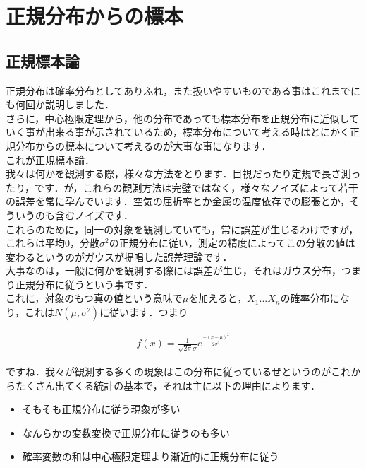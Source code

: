 \documentclass[11pt,a4paper,uplatex]{ujreport} 	%
\begin{document}
\section{正規分布からの標本}

\subsection{正規標本論}
正規分布は確率分布としてありふれ，また扱いやすいものである事はこれまでにも何回か説明しました．\\

さらに，中心極限定理から，他の分布であっても標本分布を正規分布に近似していく事が出来る事が示されているため，標本分布について考える時はとにかく正規分布からの標本について考えるのが大事な事になります．\\

これが正規標本論．\\

我々は何かを観測する際，様々な方法をとります．目視だったり定規で長さ測ったり，です．が，これらの観測方法は完璧ではなく，様々なノイズによって若干の誤差を常に孕んでいます．空気の屈折率とか金属の温度依存での膨張とか，そういうのも含むノイズです．\\

これらのために，同一の対象を観測していても，常に誤差が生じるわけですが，これらは平均0，分散$\sigma^2$の正規分布に従い，測定の精度によってこの分散の値は変わるというのがガウスが提唱した誤差理論です．\\

大事なのは，一般に何かを観測する際には誤差が生じ，それはガウス分布，つまり正規分布に従うという事です．\\

これに，対象のもつ真の値という意味で$\mu$を加えると，$X_1...X_n$の確率分布になり，これは$N(\mu, \sigma^2)$に従います．つまり

\begin{align}
  f(x) = \frac{1}{\sqrt{2\pi}\sigma}e^{\frac{-(x-\mu)^2}{2\sigma^2}}
\end{align}

ですね．我々が観測する多くの現象はこの分布に従っているぜというのがこれからたくさん出てくる統計の基本で，それは主に以下の理由によります．

\begin{itemize}
  \item そもそも正規分布に従う現象が多い
  \item なんらかの変数変換で正規分布に従うのも多い
  \item 確率変数の和は中心極限定理より漸近的に正規分布に従う
\end{itemize}
\end{document}

